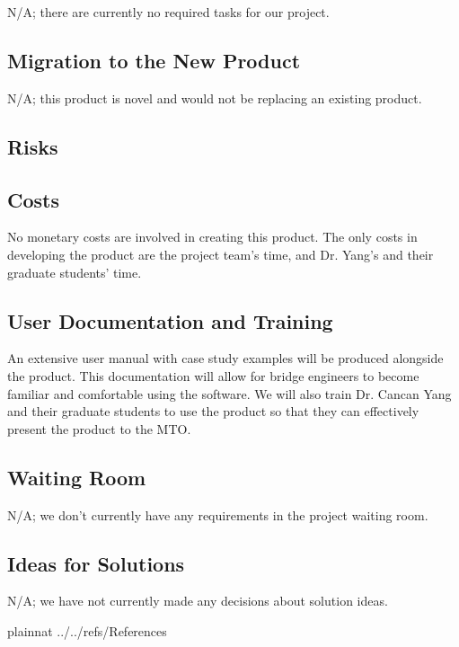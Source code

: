 \documentclass[12pt]{article}
\begin{document}
N/A; there are currently no required tasks for our project.

\subsection{Migration to the New Product}

N/A; this product is novel and would not be replacing an existing product.

\subsection{Risks}



\subsection{Costs}

No monetary costs are involved in creating this product. The only costs in developing the product are the project team's time, and Dr. Yang's and their graduate students' time.

\subsection{User Documentation and Training}

An extensive user manual with case study examples will be produced alongside the product. This documentation will allow for bridge engineers to become familiar and comfortable using the software.
We will also train Dr. Cancan Yang and their graduate students to use the product so that they can effectively present the product to the MTO.

\subsection{Waiting Room}

N/A; we don't currently have any requirements in the project waiting room.

\subsection{Ideas for Solutions}

N/A; we have not currently made any decisions about solution ideas.

\newpage

 {plainnat}
 {../../refs/References}
\end{document}
